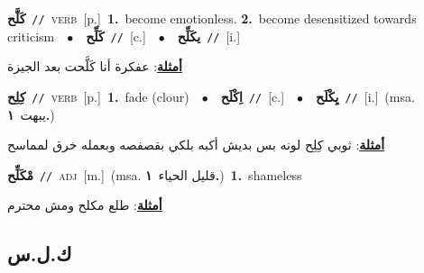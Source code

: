 \documentclass[10pt,a4paper,twoside]{article} %
\begin{document}
\begin{multicols}{2}
{\setlength\topsep{0pt}\textbf{\foreignlanguage{arabic}{كَلَّح}}\ {\color{gray}\texttt{//}\color{black}}\ \textsc{verb}\ [p.]\ \textbf{1.}~become emotionless.  \textbf{2.}~become desensitized towards criticism\ \ $\bullet$\ \ \setlength\topsep{0pt}\textbf{\foreignlanguage{arabic}{كَلِّح}}\ {\color{gray}\texttt{//}\color{black}}\ [c.]\ \ $\bullet$\ \ \setlength\topsep{0pt}\textbf{\foreignlanguage{arabic}{يكَلِّح}}\ {\color{gray}\texttt{//}\color{black}}\ [i.]\  \begin{flushright}\color{gray}\foreignlanguage{arabic}{\textbf{\underline{\foreignlanguage{arabic}{أمثلة}}}: عفكرة أنا كَلَّحت بعد الجيزة}\end{flushright}\color{black}} \vspace{2mm}

{\setlength\topsep{0pt}\textbf{\foreignlanguage{arabic}{كِلِح}}\ {\color{gray}\texttt{//}\color{black}}\ \textsc{verb}\ [p.]\ \textbf{1.}~fade (clour)\ \ $\bullet$\ \ \setlength\topsep{0pt}\textbf{\foreignlanguage{arabic}{اِكْلَح}}\ {\color{gray}\texttt{//}\color{black}}\ [c.]\ \ $\bullet$\ \ \setlength\topsep{0pt}\textbf{\foreignlanguage{arabic}{يِكْلَح}}\ {\color{gray}\texttt{//}\color{black}}\ [i.]\ \color{gray}(msa. \foreignlanguage{arabic}{يبهت}~\foreignlanguage{arabic}{\textbf{١.}})\color{black}\  \begin{flushright}\color{gray}\foreignlanguage{arabic}{\textbf{\underline{\foreignlanguage{arabic}{أمثلة}}}: ثوبي كِلِح لونه بس بديش أكبه بلكي بقصفصه وبعمله خرق لمماسح}\end{flushright}\color{black}} \vspace{2mm}

{\setlength\topsep{0pt}\textbf{\foreignlanguage{arabic}{مْكَلِّح}}\ {\color{gray}\texttt{//}\color{black}}\ \textsc{adj}\ [m.]\ \color{gray}(msa. \foreignlanguage{arabic}{قليل الحياء}~\foreignlanguage{arabic}{\textbf{١.}})\color{black}\ \textbf{1.}~shameless\  \begin{flushright}\color{gray}\foreignlanguage{arabic}{\textbf{\underline{\foreignlanguage{arabic}{أمثلة}}}: طلع مكلح ومش محترم}\end{flushright}\color{black}} \vspace{2mm}

\vspace{-3mm}
\subsection*{\color{blue}\foreignlanguage{arabic}{ك.ل.س}\color{blue}{}} 


\end{multicols}
\end{document}
